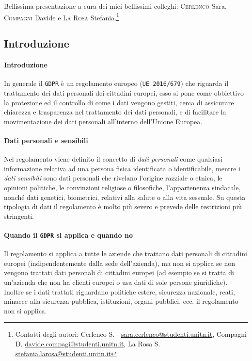 {\footnotesize Bellissima presentazione a cura dei miei bellissimi colleghi: \textsc{Cerlenco} Sara, \textsc{Compagni} Davide e \textsc{La Rosa} Stefania.\footnote{Contatti degli autori: Cerlenco S. - \href{mailto:sara.cerlenco@studenti.unitn.it}{sara.cerlenco@studenti.unitn.it}, Compagni D. \href{mailto:davide.compagi@studenti.unitn.it}{davide.compagi@studenti.unitn.it}, La Rosa S. \href{mailto:stefania.larosa@studenti.unitn.it}{stefania.larosa@studenti.unitn.it}
}
    \subsection{Introduzione}
        \paragraph{Introduzione} In generale il \texttt{GDPR} è un regolamento europeo (\texttt{UE 2016/679}) che riguarda il trattamento dei dati personali dei cittadini europei, esso si pone come obbiettivo la protezione ed il controllo di come i dati vengono gestiti, cerca di assicurare chiarezza e trasparenza nel trattamento dei dati personali, e di facilitare la movimentazione dei dati personali all'interno dell'Unione Europea.
        \paragraph{Dati personali e sensibili} Nel regolamento viene definito il concetto di \textit{dati personali} come qualsiasi informazione relativa ad una persona fisica identificata o identificabile, mentre i \textit{dati sensibili} sono dati personali che rivelano l'origine razziale o etnica, le opinioni politiche, le convinzioni religiose o filosofiche, l'appartenenza sindacale, nonché dati genetici, biometrici, relativi alla salute o alla vita sessuale. Su questa tipologia di dati il regolamento è molto più severo e prevede delle restrizioni più stringenti.
        \paragraph{Quando il \texttt{GDPR} si applica e quando no} Il regolamento si applica a tutte le aziende che trattano dati personali di cittadini europei (indipendentemente dalla sede dell'azienda), ma non si applica se non vengono trattati dati personali di cittadini europei (ad esempio se si tratta di un'azienda che non ha clienti europei o usa dati di sole persone giuridiche). Inoltre se i dati trattati riguardano politiche estere, sicurezza nazionale, reati, minacce alla sicurezza pubblica, istituzioni, organi pubblici, ecc. il regolamento non si applica.
}
